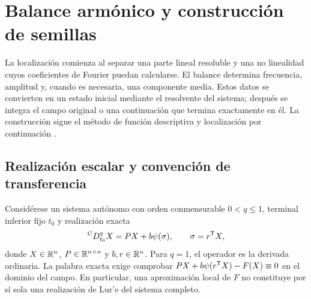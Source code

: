 \section{Balance armónico y construcción de semillas}
\label{bre:bal:sec}

La localización comienza al separar una parte lineal resoluble y una
no linealidad cuyos coeficientes de Fourier puedan calcularse. El balance
determina frecuencia, amplitud y, cuando es necesaria, una componente
media. Estos datos se convierten en un estado inicial mediante el
resolvente del sistema; después se integra el campo original o una
continuación que termina exactamente en él. La construcción sigue el
método de función descriptiva y localización por continuación
\cite{GelbVanderVelde1968,LeonovKuznetsov2013,KuznetsovEtAl2017}.

\subsection{Realización escalar y convención de transferencia}
\label{bre:bal:lure}

Considérese un sistema autónomo con orden conmensurable
\(0<q\leq1\), terminal inferior fijo \(t_0\) y realización exacta
\begin{equation}
 {}^{\mathrm C}D_{t_0}^{q}X=PX+b\psi(\sigma),\qquad
 \sigma=r^{\mathsf T}X,
 \label{bre:bal:lure-eq}
\end{equation}
donde \(X\in\mathbb R^n\), \(P\in\mathbb R^{n\times n}\) y
\(b,r\in\mathbb R^n\). Para \(q=1\), el operador es la derivada ordinaria.
La palabra exacta exige comprobar
\(PX+b\psi(r^{\mathsf T}X)-F(X)\equiv0\) en el dominio del campo.
En particular, una aproximación local de \(F\) no constituye por sí
sola una realización de Lur'e del sistema completo.

